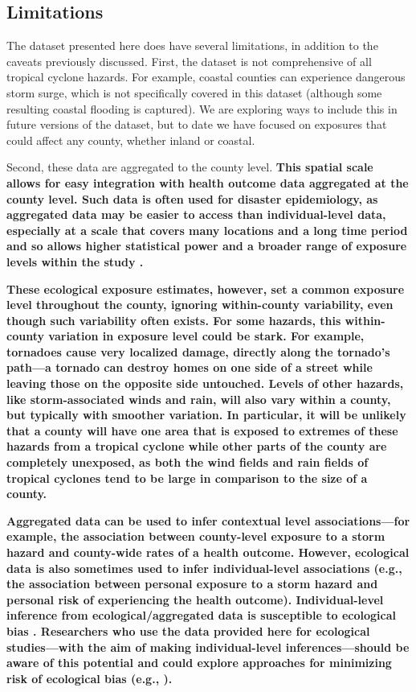 \subsection*{Limitations}

The dataset presented here does have several limitations, in addition to the
caveats previously discussed. First, the dataset is not comprehensive of all
tropical cyclone hazards. For example, coastal counties can experience
dangerous storm surge, which is not specifically covered in this dataset
(although some resulting coastal flooding is captured). We are exploring ways
to include this in future versions of the dataset, but to date we have focused
on exposures that could affect any county, whether inland or coastal.  

Second, these data are aggregated to the county level. \textbf{This spatial
scale allows for easy integration with health outcome data aggregated at the
county level. Such data is often used for disaster epidemiology, as aggregated
data may be easier to access than individual-level data, especially at a scale
that covers many locations and a long time period and so allows higher
statistical power and a broader range of exposure levels within the study
\parencite{wakefield2008overcoming}.}

\textbf{These ecological exposure estimates, however, set a common exposure
level throughout the county, ignoring within-county variability, even though
such variability often exists. For some hazards, this within-county variation
in exposure level could be stark. For example, tornadoes cause very localized
damage, directly along the tornado's path---a tornado can destroy homes on one
side of a street while leaving those on the opposite side untouched. Levels of
other hazards, like storm-associated winds and rain, will also vary within a
county, but typically with smoother variation. In particular, it will be
unlikely that a county will have one area that is exposed to extremes of these
hazards from a tropical cyclone while other parts of the county are completely
unexposed, as both the wind fields and rain fields of tropical cyclones tend to
be large in comparison to the size of a county.}

\textbf{Aggregated data can be used to infer contextual level
associations---for example, the association between county-level exposure to a
storm hazard and county-wide rates of a health outcome. However, ecological
data is also sometimes used to infer individual-level associations (e.g., the
association between personal exposure to a storm hazard and personal risk of
experiencing the health outcome). Individual-level inference from
ecological/aggregated data is susceptible to ecological bias
\parencite{greenland1994invited, portnov2007ecological, idrovo2011three}.
Researchers who use the data provided here for ecological studies---with the
aim of making individual-level inferences---should be aware of this potential
and could explore approaches for minimizing risk of ecological bias (e.g.,
\cite{wakefield2008overcoming}).}

